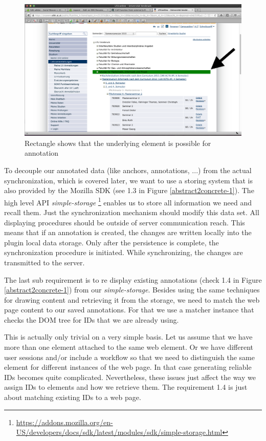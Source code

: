 \begin{figure} \centering
		\includegraphics[width=13cm]{images/annotation-rectangle-sample.png}
		\caption{Rectangle shows that the underlying element is possible for annotation}
		\label{annotation-rectangle-sample}
\end{figure} 

To decouple our annotated data (like anchors, annotations, ...) from the actual synchronization, which is covered later, we want to use a storing system that is also provided by the Mozilla SDK (see 1.3 in Figure \ref{abstract2concrete-1}). The high level API \emph{simple-storage} \footnote{\url{https://addons.mozilla.org/en-US/developers/docs/sdk/latest/modules/sdk/simple-storage.html}} enables us to store all information we need and recall them. Just the synchronization mechanism should modify this data set. All displaying procedures should be outside of server communication reach. This means that if an annotation is created, the changes are written locally into the plugin local data storage. Only after the persistence is complete, the synchronization procedure is initiated. While synchronizing, the changes are transmitted to the server. 

The last sub requirement is to re display existing annotations (check 1.4 in Figure \ref{abstract2concrete-1}) from our \emph{simple-storage}. Besides using the same techniques for drawing content and retrieving it from the storage, we need to match the web page content to our saved annotations. For that we use a matcher instance that checks the DOM tree for IDs that we are already using. 

This is actually only trivial on a very simple basis. Let us assume that we have more than one element attached to the same web element. Or we have different user sessions and/or include a workflow so that we need to distinguish the same element for different instances of the web page. In that case generating reliable IDs becomes quite complicated. Nevertheless, these issues just affect the way we assign IDs to elements and how we retrieve them. The requirement 1.4 is just about matching existing IDs to a web page. 


